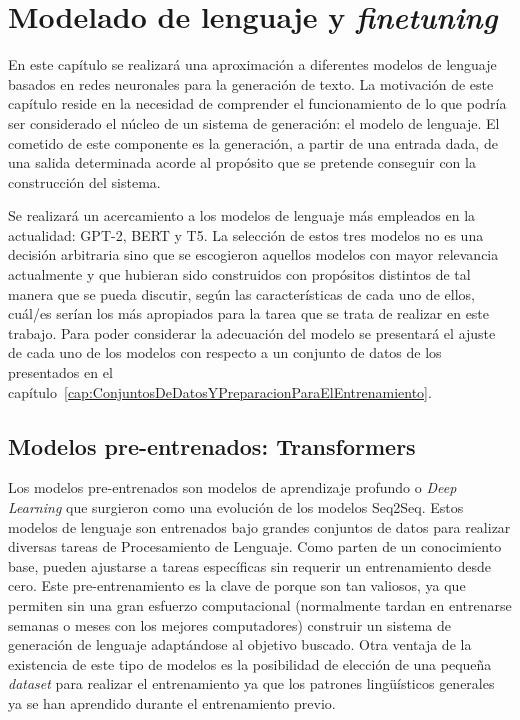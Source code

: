 \chapter{Modelado de lenguaje y \textit{finetuning}}
\label{cap:desarrollo}


En este capítulo se realizará una aproximación a diferentes modelos de lenguaje basados en redes neuronales para la generación de texto. La motivación de este capítulo reside en la necesidad de comprender el funcionamiento de lo que podría ser considerado el núcleo de un sistema de generación: el modelo de lenguaje.
El cometido de este componente es la generación, a partir de una entrada dada, de una salida determinada acorde al propósito que se pretende conseguir con la construcción del sistema. 

Se realizará un acercamiento a los modelos de lenguaje más empleados en la actualidad: GPT-2, BERT y T5. La selección de estos tres modelos no es una decisión arbitraria sino que se escogieron aquellos modelos con mayor relevancia actualmente y que hubieran sido construidos con propósitos distintos de tal manera que se pueda discutir, según las características de cada uno de ellos, cuál/es serían los más apropiados para la tarea que se trata de realizar en este trabajo. Para poder considerar la adecuación del modelo se presentará el ajuste de cada uno de los modelos con respecto a un conjunto de datos de los presentados en el capítulo~\ref{cap:ConjuntosDeDatosYPreparacionParaElEntrenamiento}.


\section{Modelos pre-entrenados: Transformers}
\label{sec:transformers}
Los modelos pre-entrenados son modelos de aprendizaje profundo o \textit{Deep Learning} que surgieron como una evolución de los modelos Seq2Seq. Estos modelos de lenguaje son entrenados bajo grandes conjuntos de datos para realizar diversas tareas de Procesamiento de Lenguaje. Como parten de un conocimiento base, pueden ajustarse a tareas específicas sin requerir un entrenamiento desde cero. Este pre-entrenamiento es la clave de porque son tan valiosos, ya que permiten sin una gran esfuerzo computacional (normalmente tardan en entrenarse semanas o meses con los mejores computadores) construir un sistema de generación de lenguaje adaptándose al objetivo buscado. Otra ventaja de la existencia de este tipo de modelos es la posibilidad de elección de una pequeña \textit{dataset} para realizar el entrenamiento ya que los patrones lingüísticos generales ya se han aprendido durante el entrenamiento previo.




